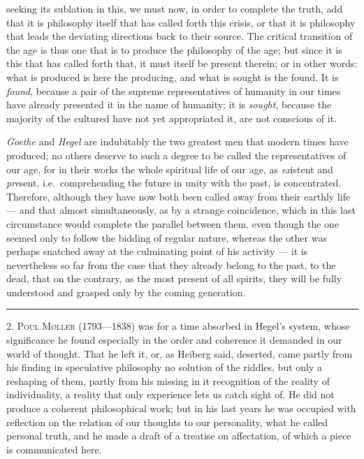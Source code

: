 \documentclass[12pt,a4paper,openany]{book}
\newcommand{\opage}[1]{\marginnote{\footnotesize\textit{[#1]}}}
\newenvironment{intro}{\par}{\par}
\newcommand{\sectionrule}{\par\begin{center}\rule{4em}{0.4pt}\end{center}}
\begin{document}
seeking its sublation in this, we must now, in order to complete the truth, add that
it is philosophy itself that has called forth this crisis, or that it is philosophy
that leads the deviating directions back to their source. The critical transition of
the age is thus one that is to produce the philosophy of the age; but since it is this
that has called forth that, it must itself be present therein; or in other words: what
is produced is here the producing, and what is sought is the found. It is \emph{found},
\setcounter{footnote}{0}%
\opage{155}because a pair of the supreme representatives of humanity in our times have
already presented it in the name of humanity; it is \emph{sought}, because the
majority of the cultured have not yet appropriated it, are not conscious of it.

\emph{Goethe} and \emph{Hegel} are indubitably the two greatest men that modern times
have produced; no others deserve to such a degree to be called the representatives of
our age, for in their works the whole spiritual life of our age, as \emph{ex}istent
and \emph{pre}sent, i.e.\ comprehending the future in unity with the past, is
concentrated. Therefore, although they have now both been called away from their
earthly life --- and that almost simultaneously, as by a strange coincidence, which in
this last circumstance would complete the parallel between them, even though the one
seemed only to follow the bidding of regular nature, whereas the other was perhaps
snatched away at the culminating point of his activity --- it is nevertheless so far
from the case that they already belong to the past, to the dead, that on the
contrary, as the most present of all spirits, they will be fully understood and
grasped only by the coming generation.

\sectionrule

\begin{intro}

2. \textsc{Poul Møller} (1793---1838) was for a time absorbed in Hegel's system, whose
significance he found especially in the order and coherence it demanded in our world
of thought. That he left it, or, as Heiberg said, deserted, came partly from his
finding in speculative philosophy no solution of the riddles, but only a reshaping of
them, partly from his missing in it recognition of the reality of individuality, a
reality that only experience lets us catch sight of. He did not produce a coherent
philosophical work; but in his last years he was occupied with reflection on the
relation of our thoughts to our personality, what he called personal truth, and he
made a draft of a treatise on affectation, of which a piece is communicated here.
\end{intro}
\end{document}
